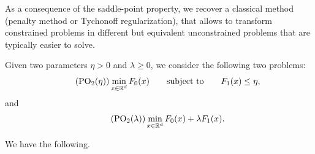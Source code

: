      As a consequence of the saddle-point property, we recover a classical method (penalty method or Tychonoff regularization), that allows to transform constrained problems in different but equivalent unconstrained problems that are typically easier to solve.
 
     Given two parameters $\eta> 0$ and $\lambda \ge 0$, we consider the following two problems:
     \begin{equation}
         \label{eq:op-eta}
         \tag{PO$_2$($\eta$)}
         \min_{x\in\mathbb{R}^d}F_0(x)
         \qquad\text{subject to}\qquad
         F_1(x)\le \eta,
     \end{equation}
     and
     \begin{equation}
         \label{eq:op-lambda}
         \tag{PO$_2$($\lambda$)}
         \min_{x\in\mathbb{R}^d}F_0(x) + \lambda F_1(x).
     \end{equation}
 
     We have the following.
 
 
